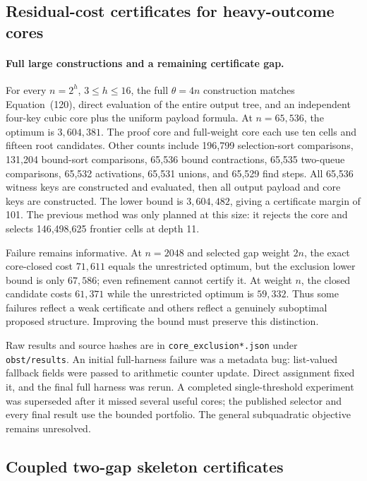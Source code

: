 \documentclass[11pt]{article}
\begin{document}
\subsection{Residual-cost certificates for heavy-outcome cores}
\paragraph{Full large constructions and a remaining certificate gap.}
For every $n=2^h$, $3\le h\le16$, the full $\theta=4n$ construction matches
Equation~(120), direct evaluation of the entire
output tree, and an independent four-key cubic core plus the uniform
payload formula. At $n=65,536$, the optimum is $3,604,381$. The proof core
and full-weight core each use ten cells and fifteen root candidates. Other
counts include 196,799 selection-sort comparisons, 131,204 bound-sort
comparisons, 65,536 bound contractions, 65,535 two-queue comparisons,
65,532 activations, 65,531 unions, and 65,529 find steps. All 65,536 witness
keys are constructed and evaluated, then all output payload and core keys
are constructed. The lower bound is $3,604,482$, giving a certificate margin
of 101.
The previous method was only planned at this size: it rejects the core and
selects 146,498,625 frontier cells at depth 11.

Failure remains informative. At $n=2048$ and selected gap weight $2n$, the
exact core-closed cost $71,611$ equals the unrestricted optimum, but the
exclusion lower bound is only $67,586$; even refinement cannot certify it.
At weight $n$, the closed candidate costs $61,371$ while the unrestricted
optimum is $59,332$. Thus some failures reflect a weak certificate and
others reflect a genuinely suboptimal proposed structure. Improving the
bound must preserve this distinction.

Raw results and source hashes are in \texttt{core\_exclusion*.json} under
\texttt{obst/results}. An initial full-harness failure was a metadata bug:
list-valued fallback fields were passed to arithmetic counter update. Direct
assignment fixed it, and the final full harness was rerun. A completed
single-threshold experiment was superseded after it missed several useful
cores; the published selector and every final result use the bounded
portfolio. The general subquadratic objective remains unresolved.


\subsection{Coupled two-gap skeleton certificates}
\end{document}
